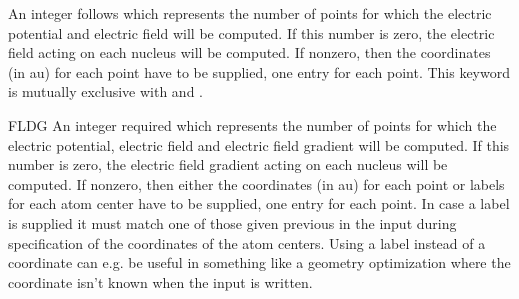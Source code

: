 \begin{keywordlist}
An integer follows which represents the
number of points for which the electric potential and electric field will be computed. If
this number is zero, the electric field acting on each nucleus will be
computed. If nonzero, then the coordinates (in au) for each point have to be
supplied, one entry for each point.
This keyword is mutually exclusive with  and .
\item[FLDG]
An integer required which represents the
number of points for which the electric potential, electric field and electric field gradient will be
computed. If this number is zero, the electric field gradient acting
on each nucleus will be computed. If nonzero, then either the coordinates (in au) for
each point or labels for each atom center have to be supplied, one entry for each point.
In case a label is supplied it must match one of those given previous in the input during specification
of the coordinates of the atom centers. Using a label instead of a coordinate can e.g. be useful
in something like a geometry optimization where the coordinate isn't known when the input is written.

\end{keywordlist}
